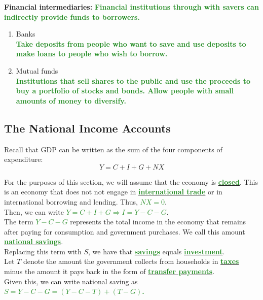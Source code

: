 \documentclass[11pt]{article}\usepackage[]{graphicx}\usepackage[]{color}
\theoremstyle{definition}
\newcommand{\ddp}[1]{{\textbf{\textcolor{ForestGreen}{#1}}}}
\newcommand{\dd}[1]{{\underline{\textbf{\textcolor{ForestGreen}{#1}}}}}
\newcommand{\defn}[1]{\textbf{#1}}
\begin{document}
\defn{Financial intermediaries:} \ddp{Financial institutions through with savers can indirectly provide funds to borrowers.}

\begin{enumerate}
	\setlength{\itemsep}{1em}
	\item Banks
	 \ddp{\\Take deposits from people who want to save and use deposits to make loans to people who wish to borrow.}
	\item Mutual funds 
	\ddp{\\Institutions that sell shares to the public and use the proceeds to buy a portfolio of stocks and bonds. Allow people with small amounts of money to diversify.}
\end{enumerate}
\vspace{1em}

\subsection{The National Income Accounts}

Recall that GDP can be written as the sum of the four components of expenditure: 
\begin{equation*}
Y = C + I + G + NX
\end{equation*}

For the purposes of this section, we will assume that the economy is \dd{closed}. This is an economy that does not not engage in \dd{international trade} or in international borrowing and lending. Thus, \dd{$NX = 0$}.
\\

Then, we can write \dd{$Y = C + I + G \Rightarrow I = Y - C - G$}.
\\

The term \dd{$Y - C - G$} represents the total income in the economy that remains after paying for consumption and government purchases. We call this amount \dd{national savings}. 
\\

Replacing this term with $S$, we have that \dd{savings} equals \dd{investment}.
\\

Let $T$ denote the amount the government collects from households in \dd{taxes} minus the amount it pays back in the form of \dd{transfer payments}.
\\

Given this, we can write national saving as \ddp{$S = Y - C - G = (Y - C - T) + (T - G)$.}
\\
\end{document}
